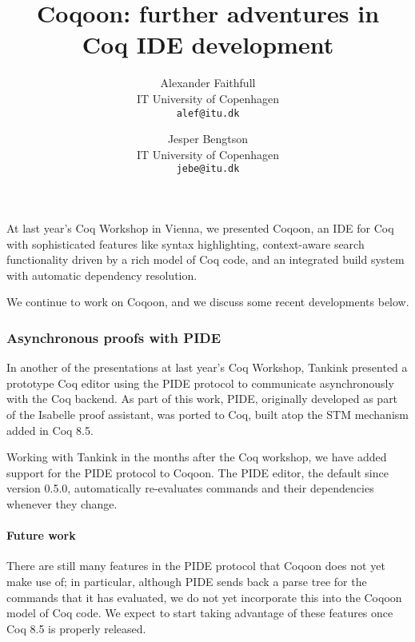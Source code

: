 \documentclass{article}
\author{
	Alexander Faithfull\\IT University of Copenhagen\\\texttt{alef@itu.dk}
	\and
	Jesper Bengtson\\IT University of Copenhagen\\\texttt{jebe@itu.dk}}
\title{Coqoon: further adventures in\\Coq IDE development}
\date{}
\begin{document}
\maketitle

\noindent
At last year's Coq Workshop in Vienna, we presented Coqoon\cite{Faithfull2014Coqoon},
an IDE for Coq with sophisticated features like syntax highlighting,
context-aware search functionality driven by a rich model of Coq code,
and an integrated build system with automatic dependency
resolution.

We continue to work on Coqoon, and we discuss some recent developments below.

\begin{comment}

Since then, we have added (experimental) support for the PIDE protocol,
bringing automatic and asynchronous re-evaluation of proofs; added a user
interface for managing Coq load paths; and implemented a
clone of Coqoon's build system in Python, making it even easier for people to
work on Coqoon projects without having to use it.

\end{comment}

\subsubsection*{Asynchronous proofs with PIDE}

In another of the presentations at last year's Coq Workshop, Tankink presented
a prototype Coq editor\cite{Tankink2014PIDE} using the PIDE protocol to
communicate asynchronously with the Coq backend. As part of this work, PIDE,
originally
developed as part of the Isabelle proof assistant, was ported to Coq, built
atop the
STM mechanism added in Coq 8.5.

Working with Tankink in the months after the Coq workshop, we have added
support for the PIDE protocol to Coqoon. The PIDE editor, the default since
version 0.5.0, automatically re-evaluates commands and their dependencies
whenever they change.

\paragraph{Future work}

There are still many features in the PIDE protocol that Coqoon does not yet
make use of; in particular, although PIDE sends back a parse tree for the
commands that it has evaluated, we do not yet incorporate this into the Coqoon
model of Coq code. We expect to start taking advantage of these features once
Coq 8.5 is properly released.
\end{document}
